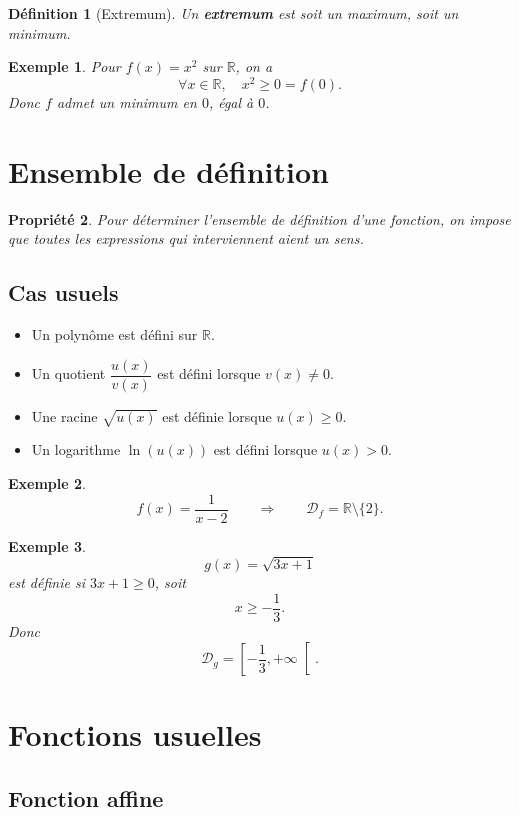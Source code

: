 \documentclass[11pt,a4paper]{article}
\newtheorem{definition}{Définition}[section]
\newtheorem{propriete}[definition]{Propriété}
\newtheorem*{exemple}{Exemple}
\newcommand{\R}{\mathbb{R}}
\newcommand{\D}{\mathcal{D}}
\begin{document}
\begin{definition}[Extremum]
Un \textbf{extremum} est soit un maximum, soit un minimum.
\end{definition}

\begin{exemple}
Pour \(f(x)=x^2\) sur \(\R\), on a
\[
\forall x\in\R,\quad x^2\ge 0=f(0).
\]
Donc \(f\) admet un minimum en \(0\), égal à \(0\).
\end{exemple}

\section{Ensemble de définition}

\begin{propriete}
Pour déterminer l'ensemble de définition d'une fonction, on impose que toutes les expressions qui interviennent aient un sens.
\end{propriete}

\subsection{Cas usuels}

\begin{itemize}
    \item Un polynôme est défini sur \(\R\).
    \item Un quotient \(\dfrac{u(x)}{v(x)}\) est défini lorsque \(v(x)\neq 0\).
    \item Une racine \(\sqrt{u(x)}\) est définie lorsque \(u(x)\ge 0\).
    \item Un logarithme \(\ln(u(x))\) est défini lorsque \(u(x)>0\).
\end{itemize}

\begin{exemple}
\[
f(x)=\frac{1}{x-2}
\qquad \Rightarrow \qquad \D_f=\R\setminus\{2\}.
\]
\end{exemple}

\begin{exemple}
\[
g(x)=\sqrt{3x+1}
\]
est définie si \(3x+1\ge 0\), soit
\[
x\ge -\frac13.
\]
Donc
\[
\D_g=\left[-\frac13,+\infty\right[.
\]
\end{exemple}

\section{Fonctions usuelles}

\subsection{Fonction affine}
\end{document}
